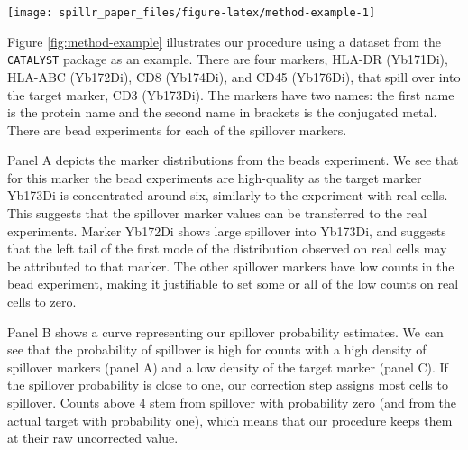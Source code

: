 \documentclass{bioinfo}
\begin{document}
\begin{figure*}

{\centering \texttt{[image: spillr\_paper\_files/figure-latex/method-example-1]} 

}

\caption{Panel A shows a density plot of target and spillover markers based on the beads experiment, Panel B shows spillover probability for Yb173Di estimated by \texttt{spillR}, and Panel C compares spillover compensation on real cells by our methods and \texttt{CATALYST}. Counts are arcsinh transformed with cofactor of five \citep{bendall2011single}, zero counts are not shown. As seen in Panel C, our baseline method \texttt{spillR-naive} performs similarly to \texttt{CATALYST} and compensates the first peak of the uncorrected data (red) between about 2 and 4 as spillover. By contrast, \texttt{spillR} is sensitive to the difference in shape between the peaks in the bead data (Panel A) and the first peak in the real data (Panel C red), and only compensates the part of the red curve as spillover that matches the bead experiment. This figure is an example of the diagnostic plot obtained when using the function \texttt{plotDiagnostics} in \texttt{spillR}.}\label{fig:method-example}
\end{figure*}

Figure \ref{fig:method-example} illustrates our procedure using a
dataset from the \texttt{CATALYST} package as an example. There are four
markers, HLA-DR (Yb171Di), HLA-ABC (Yb172Di), CD8 (Yb174Di), and CD45
(Yb176Di), that spill over into the target marker, CD3 (Yb173Di). The
markers have two names: the first name is the protein name and the
second name in brackets is the conjugated metal. There are bead
experiments for each of the spillover markers.

Panel A depicts the marker distributions from the beads experiment. We
see that for this marker the bead experiments are high-quality as the
target marker Yb173Di is concentrated around six, similarly to the
experiment with real cells. This suggests that the spillover marker
values can be transferred to the real experiments. Marker Yb172Di shows
large spillover into Yb173Di, and suggests that the left tail of the
first mode of the distribution observed on real cells may be attributed
to that marker. The other spillover markers have low counts in the bead
experiment, making it justifiable to set some or all of the low counts
on real cells to zero.

Panel B shows a curve representing our spillover probability estimates.
We can see that the probability of spillover is high for counts with a
high density of spillover markers (panel A) and a low density of the
target marker (panel C). If the spillover probability is close to one,
our correction step assigns most cells to spillover. Counts above \(4\)
stem from spillover with probability zero (and from the actual target
with probability one), which means that our procedure keeps them at
their raw uncorrected value.
\end{document}
